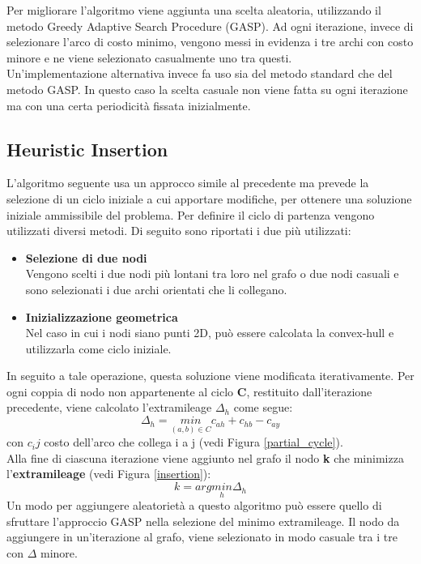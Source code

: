 Per migliorare l'algoritmo viene aggiunta una scelta aleatoria, utilizzando il metodo Greedy Adaptive Search Procedure (GASP). Ad ogni iterazione, invece di selezionare l'arco di costo minimo, vengono messi in evidenza i tre archi con costo minore e ne viene selezionato casualmente uno tra questi.\\
Un'implementazione alternativa invece fa uso sia del metodo standard che del metodo GASP. In questo caso la scelta casuale non viene fatta su ogni iterazione ma con una certa periodicità fissata inizialmente.

\subsection{Heuristic Insertion}
L'algoritmo seguente usa un approcco simile al precedente ma prevede la selezione di un ciclo iniziale a cui apportare modifiche, per ottenere una soluzione iniziale ammissibile del problema. Per definire il ciclo di partenza vengono utilizzati diversi metodi. Di seguito sono riportati i due più utilizzati:
\begin{itemize}
\item{\textbf{Selezione di due nodi}\\
Vengono scelti i due nodi più lontani tra loro nel grafo o due nodi casuali e  sono selezionati i due archi orientati che li collegano.
}
\item{\textbf{Inizializzazione geometrica}\\
Nel caso in cui i nodi siano punti 2D, può essere calcolata la convex-hull e utilizzarla come ciclo iniziale. 
}
\end{itemize}
In seguito a tale operazione, questa soluzione viene modificata iterativamente. Per ogni coppia di nodo non appartenente al ciclo \textbf{C}, restituito dall'iterazione precedente, viene calcolato l'extramileage $\Delta_h$ come segue:
$$\Delta_h = \underset{(a,b)\in C}{min} c_{ah}+c_{hb}-c_{ay}$$
con $c_ij$ costo dell'arco che collega i a j (vedi Figura \ref{partial_cycle}).\\
Alla fine di ciascuna iterazione viene aggiunto nel grafo il nodo \textbf{k} che minimizza l'\textbf{extramileage} (vedi Figura \ref{insertion}):\\
$$k = arg\underset{h}{min}\Delta_{h}$$
Un modo per aggiungere aleatorietà a questo algoritmo può essere quello di sfruttare l'approccio GASP nella selezione del minimo extramileage. Il nodo da aggiungere in un'iterazione al grafo, viene selezionato in modo casuale tra i tre con $\Delta$ minore.
